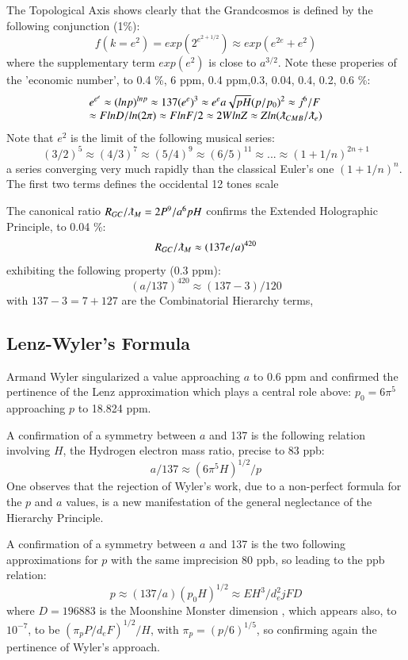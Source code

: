 \documentclass[twoside,draft]{article}
\begin{document}
\begin{sloppypar}
The Topological Axis shows clearly that the Grandcosmos is defined by the following conjunction (1\%):
\begin{equation}
f(k = e^{2}) = exp(2^{e^{2+1/2}}) \approx exp(e^{2e}+e^{2})
\end{equation}
where the supplementary term $exp(e^2)$ is close to $a^{3/2}$. Note these properies of the 'economic number', to 
0.4 \%, 6 ppm, 0.4 ppm,0.3, 0.04, 0.4, 0.2, 0.6 \%:
$$
\begin{array}{ll}
%
\displaystyle
e^{e^e}\approx (lnp)^{lnp}  
\approx 137 (e^{e})^3 \approx e^e a \sqrt{pH} (p/p_0)^2 \approx j^6/F \\
\approx FlnD/ln(2\pi) \approx FlnF/2 \approx 2WlnZ \approx Zln(\lambdabar_{CMB}/\lambdabar_e) 
\end{array}
$$
Note that $e^2$ is the limit of the following musical series:
$$(3/2)^5 \approx (4/3)^7   \approx (5/4)^9  \approx  (6/5)^{11}  \approx   ...  \approx  (1+1/n)^{2n+1}  $$  
a series converging very much rapidly than the classical Euler's one $(1+1/n)^n$. The first two terms defines the occidental 12 tones scale

The canonical ratio $R_{GC}/\lambdabar_M = 2P^9/a^6pH $ confirms the Extended Holographic Principle, to 0.04 \%:
\begin{equation}
R_{GC}/\lambdabar_M  \approx (137e/a)^{420}  
\end{equation}
exhibiting the following property (0.3 ppm):
 $$ (a/137)^{420} \approx (137 - 3)/120 $$  
with $137 - 3 = 7 + 127$ are the Combinatorial Hierarchy terms, 

\subsection {Lenz-Wyler's Formula}
Armand Wyler singularized a value approaching $a$ to 0.6 ppm and confirmed the pertinence
of the Lenz approximation which plays a central role above: $p_{0} = 6\pi^{5}$ approaching $p$ to 18.824 ppm.

A confirmation of a symmetry between $a$ and 137 is the following relation involving $H$, the
Hydrogen electron mass ratio, precise to 83 ppb:
$$a/137 \approx (6\pi^{5} H)^{1/2} /p$$
One observes that the rejection of Wyler's work, due to a non-perfect formula for the $p$ and $a$ values, is a new
manifestation of the general neglectance of the Hierarchy Principle.

A confirmation of a symmetry between $a$ and 137 is the two following approximations for $p$ with the same imprecision 80 ppb, so leading to the ppb relation:
 $$p \approx (137/a) (p_0 H)^{1/2}  \approx EH^3/d_e^2jFD $$ 
where $D = 196883$ is the Moonshine Monster dimension \cite{Conway}, which appears also, to $10^{-7}$, to be $(\pi_p P/d_eF)^{1/2}/H$, with $\pi_p = (p/6)^{1/5}$, so confirming again the pertinence of Wyler's approach. 


\end{sloppypar}
\end{document}

